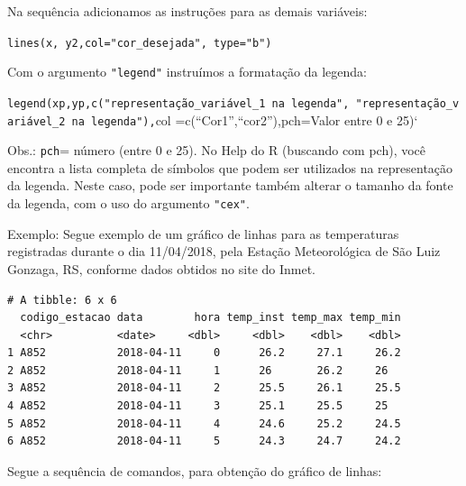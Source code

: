 \documentclass[12pt,brazil,oneside]{book}
\newenvironment{Shaded}{\begin{snugshade}}{\end{snugshade}}
\newcommand{\DataTypeTok}[1]{\textcolor[rgb]{0.13,0.29,0.53}{#1}}
\newcommand{\KeywordTok}[1]{\textcolor[rgb]{0.13,0.29,0.53}{\textbf{#1}}}
\newcommand{\NormalTok}[1]{#1}
\newcommand{\OtherTok}[1]{\textcolor[rgb]{0.56,0.35,0.01}{#1}}
\newcommand{\StringTok}[1]{\textcolor[rgb]{0.31,0.60,0.02}{#1}}
\begin{document}
Na sequência adicionamos as instruções para as demais variáveis:

\texttt{lines(x,\ y2,col="cor\_desejada",\ type="b")}

Com o argumento \texttt{"legend"} instruímos a formatação da legenda:

\texttt{legend(xp,yp,c("representação\_variável\_1\ na\ legenda",\ "representação\_variável\_2\ na\ legenda"),}col =c(``Cor1'',``cor2''),pch=Valor entre 0 e 25)`

Obs.: \texttt{pch}= número (entre 0 e 25). No Help do R (buscando com pch), você encontra a lista completa de símbolos que podem ser utilizados na representação da legenda.
Neste caso, pode ser importante também alterar o tamanho da fonte da legenda, com o uso do argumento \texttt{"cex"}.

Exemplo: Segue exemplo de um gráfico de linhas para as temperaturas registradas durante o dia 11/04/2018, pela Estação Meteorológica de São Luiz Gonzaga, RS, conforme dados obtidos no site do Inmet.

\begin{Shaded}
\end{Shaded}

\begin{verbatim}
# A tibble: 6 x 6
  codigo_estacao data        hora temp_inst temp_max temp_min
  <chr>          <date>     <dbl>     <dbl>    <dbl>    <dbl>
1 A852           2018-04-11     0      26.2     27.1     26.2
2 A852           2018-04-11     1      26       26.2     26  
3 A852           2018-04-11     2      25.5     26.1     25.5
4 A852           2018-04-11     3      25.1     25.5     25  
5 A852           2018-04-11     4      24.6     25.2     24.5
6 A852           2018-04-11     5      24.3     24.7     24.2
\end{verbatim}

Segue a sequência de comandos, para obtenção do gráfico de linhas:
\end{document}
